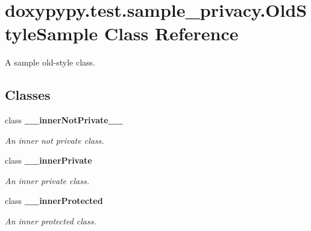 \hypertarget{classdoxypypy_1_1test_1_1sample__privacy_1_1_old_style_sample}{\section{doxypypy.\-test.\-sample\-\_\-privacy.\-Old\-Style\-Sample Class Reference}
\label{classdoxypypy_1_1test_1_1sample__privacy_1_1_old_style_sample}
}


A sample old-\/style class.  


\subsection*{Classes}
\begin{DoxyCompactItemize}
\item 
class {\bfseries \-\_\-\-\_\-inner\-Not\-Private\-\_\-\-\_\-}
\begin{DoxyCompactList}\small\item\em An inner not private class. \end{DoxyCompactList}\item 
class {\bfseries \-\_\-\-\_\-inner\-Private}
\begin{DoxyCompactList}\small\item\em An inner private class. \end{DoxyCompactList}\item 
class {\bfseries \-\_\-\-\_\-inner\-Protected}
\begin{DoxyCompactList}\small\item\em An inner protected class. \end{DoxyCompactList}\end{DoxyCompactItemize}

